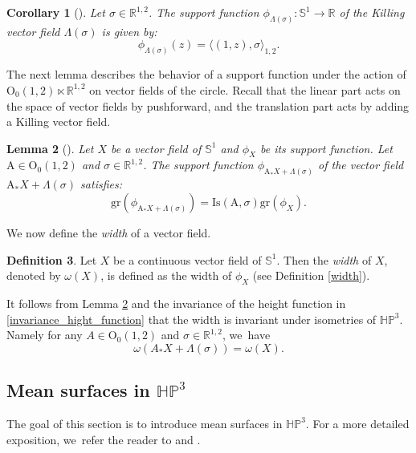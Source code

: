 \documentclass[JEP,XML,SOM,Unicode,NoEqCountersInSection, NoFloatCountersInSection,published]{cedram}
\theoremstyle{plain}
\newtheorem{cor}{Corollary}[section]
\newtheorem{lemma}[cor]{Lemma}
\theoremstyle{definition}
\newtheorem{defi}[cor]{Definition}
\newcommand{\minko}{\mathbb{R}^{1,2}}
\newcommand{\HP}{\mathbb{HP}^3}
\newcommand{\inner}[1] {\langle #1 \rangle}
\begin{document}
\begin{cor}[{\cite[Cor.\,2.10]{diaf2023Infearth}}]\label{support_function_of_killing}
Let $\sigma\in \mathbb{R}^{1,2}$. The support function $\phi_{\Lambda(\sigma)}:\mathbb{S}^1\to \mathbb{R}$ of the Killing vector field $\Lambda(\sigma)$ is given by:
\[
\phi_{\Lambda(\sigma)}(z)=\inner{(1,z),\sigma}_{1,2}.
\]
\end{cor}
The next lemma describes the behavior of a support function under the action of $\mathrm{O}_0(1,2)\ltimes\minko$ on vector fields of the circle. Recall that the linear part acts on the space of vector fields by pushforward, and the translation part acts by adding a Killing vector field.

\begin{lemma}[{\cite[Lem.\,2.12]{diaf2023Infearth}}]\label{equii}
Let $X$ be a vector field of $\mathbb{S}^1$ and $\phi_X$ be its support function. Let $\mathrm{A}\in\mathrm{O}_0(1,2)$ and $\sigma\in\minko$. The support function $\phi_{\mathrm{A}_*X+\Lambda(\sigma)}$ of the vector field $\mathrm{A}_*X+\Lambda(\sigma)$ satisfies:\begin{equation}
\mathrm{gr}(\phi_{\mathrm{A}_*X+\Lambda(\sigma)})=\mathrm{Is}(\mathrm{A},\sigma)\mathrm{gr}(\phi_X).
\end{equation}

\end{lemma}
We now define the \emph{width} of a vector field.

\begin{defi}\label{widthX}
Let $X$ be a continuous vector field of $\mathbb{S}^1$. Then the \emph{width} of $X$, denoted by $\omega(X)$, is defined as the width of $\phi_X$ (see Definition \ref{width}).
\end{defi}
It follows from Lemma \ref{equii} and the invariance of the height function in \eqref{invariance_hight_function} that the width is invariant under isometries of $\HP$. Namely for any $A\in \mathrm{O}_{0}(1,2)$ and $\sigma\in\minko$, we~have
\[
\omega(A_*X+\Lambda(\sigma))=\omega(X).
\]

\subsection{Mean surfaces in \texorpdfstring{$\HP$}{HP}}
The goal of this section is to introduce mean surfaces in $\HP$. For a more detailed exposition, we~refer the reader to \cite[\S 5.2-6.3]{fillastreseppi} and \cite[\S 2.3.2]{barbotfillastre}.
\end{document}
